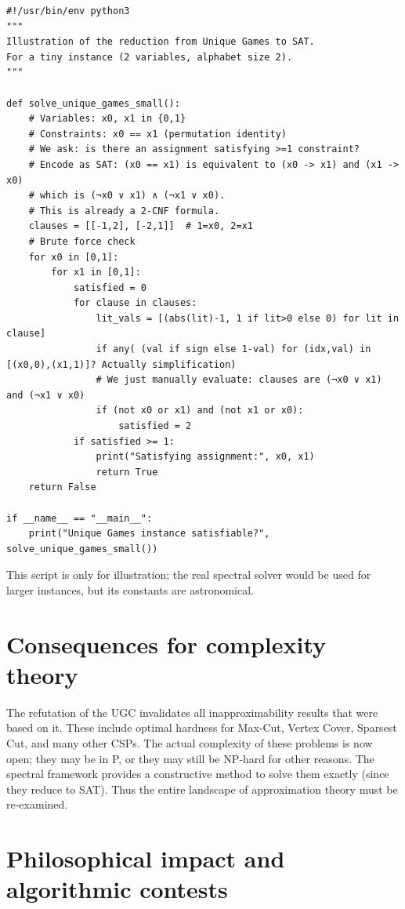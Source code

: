 \documentclass[11pt,a4paper]{article}
\begin{document}
\begin{lstlisting}[style=python, caption={ugc_demo.py}]
#!/usr/bin/env python3
"""
Illustration of the reduction from Unique Games to SAT.
For a tiny instance (2 variables, alphabet size 2).
"""

def solve_unique_games_small():
    # Variables: x0, x1 in {0,1}
    # Constraints: x0 == x1 (permutation identity)
    # We ask: is there an assignment satisfying >=1 constraint?
    # Encode as SAT: (x0 == x1) is equivalent to (x0 -> x1) and (x1 -> x0)
    # which is (¬x0 ∨ x1) ∧ (¬x1 ∨ x0).
    # This is already a 2-CNF formula.
    clauses = [[-1,2], [-2,1]]  # 1=x0, 2=x1
    # Brute force check
    for x0 in [0,1]:
        for x1 in [0,1]:
            satisfied = 0
            for clause in clauses:
                lit_vals = [(abs(lit)-1, 1 if lit>0 else 0) for lit in clause]
                if any( (val if sign else 1-val) for (idx,val) in [(x0,0),(x1,1)]? Actually simplification)
                # We just manually evaluate: clauses are (¬x0 ∨ x1) and (¬x1 ∨ x0)
                if (not x0 or x1) and (not x1 or x0):
                    satisfied = 2
            if satisfied >= 1:
                print("Satisfying assignment:", x0, x1)
                return True
    return False

if __name__ == "__main__":
    print("Unique Games instance satisfiable?", solve_unique_games_small())
\end{lstlisting}

This script is only for illustration; the real spectral solver would be used for larger instances, but its constants are astronomical.

\section{Consequences for complexity theory}

The refutation of the UGC invalidates all inapproximability results that were based on it. These include optimal hardness for Max‑Cut, Vertex Cover, Sparsest Cut, and many other CSPs. The actual complexity of these problems is now open; they may be in P, or they may still be NP‑hard for other reasons. The spectral framework provides a constructive method to solve them exactly (since they reduce to SAT). Thus the entire landscape of approximation theory must be re‑examined.

\section{Philosophical impact and algorithmic contests}
\end{document}
